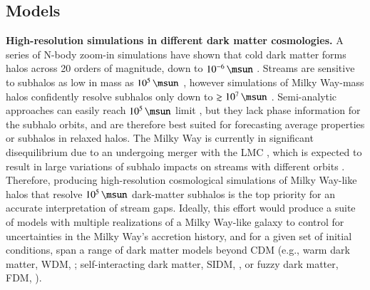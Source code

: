 \documentclass[final,5p,times,twocolumn,authoryear]{elsarticle}
\begin{document}
\subsection{Models}
\textbf{High-resolution simulations in different dark matter cosmologies.}
A series of N-body zoom-in simulations have shown that cold dark matter forms halos across 20 orders of magnitude, down to $10^{-6}\,\unit{\msun}$ \citep[approximately Earth mass,][]{diemand:2005, springel:2008, wangj:2020}.
Streams are sensitive to subhalos as low in mass as $10^5\,\unit{\msun}$ \citep[e.g.,][]{drlica-wagner:2019}, however simulations of Milky Way-mass halos confidently resolve subhalos only down to $\gtrsim10^7\,\unit{\msun}$ \citep[cf.][]{wetzel:2016, richings:2020, nadler:2023, mansfield:2023}.
Semi-analytic approaches can easily reach $10^5\,\unit{\msun}$ limit \citep[][]{press:1974,sheth:2002,benson:2012}, but they lack phase information for the subhalo orbits, and are therefore best suited for forecasting average properties or subhalos in relaxed halos.
The Milky Way is currently in significant disequilibrium due to an undergoing merger with the LMC \citep[e.g.,][]{besla:2007,kallivayalil:2013,vasiliev:2024}, which is expected to result in large variations of subhalo impacts on streams with different orbits \citep{barry:2023,arora:2023}.
Therefore, producing high-resolution cosmological simulations of Milky Way-like halos that resolve $10^5\,\unit{\msun}$ dark-matter subhalos is the top priority for an accurate interpretation of stream gaps.
Ideally, this effort would produce a suite of models with multiple realizations of a Milky Way-like galaxy to control for uncertainties in the Milky Way's accretion history, and for a given set of initial conditions, span a range of dark matter models beyond CDM (e.g., warm dark matter, WDM, \citealt{bode:2001}; self-interacting dark matter, SIDM, \citealt{spergel:2000}, or fuzzy dark matter, FDM, \citealt{hu:2000}).
\end{document}
